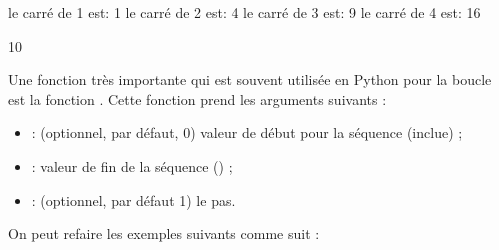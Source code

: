 \documentclass[letterpaper,10pt,french]{sphinxmanual}
\begin{document}
\begin{sphinxVerbatim}[commandchars=\\\{\}]
le carré de 1 est: 1
le carré de 2 est: 4
le carré de 3 est: 9
le carré de 4 est: 16
\end{sphinxVerbatim}

\begin{sphinxVerbatim}[commandchars=\\\{\}]
  
   \PYG{p}{[}   \PYG{p}{]}
      
\end{sphinxVerbatim}

\begin{sphinxVerbatim}[commandchars=\\\{\}]
10
\end{sphinxVerbatim}

\sphinxAtStartPar
Une fonction très importante qui est souvent utilisée en Python pour la boucle  est la fonction . Cette fonction prend les arguments suivants :
\begin{itemize}
\item {} 
\sphinxAtStartPar
{} : (optionnel, par défaut, 0) valeur de début pour la séquence (inclue) ;

\item {} 
\sphinxAtStartPar
{} : valeur de fin de la séquence () ;

\item {} 
\sphinxAtStartPar
{} : (optionnel, par défaut 1) le pas.

\end{itemize}

\sphinxAtStartPar
On peut refaire les exemples suivants comme suit :

\begin{sphinxVerbatim}[commandchars=\\\{\}]
    
       
\end{sphinxVerbatim}
\end{document}
